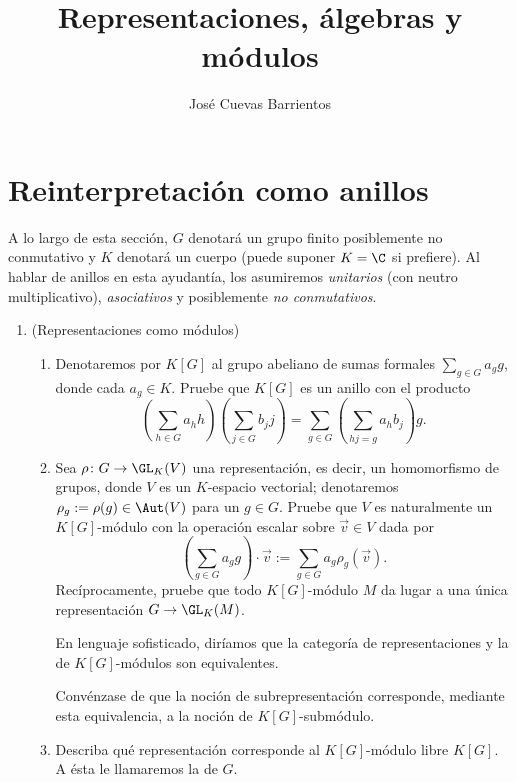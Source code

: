 \documentclass[11pt, reqno]{amsart}
\title{Representaciones, álgebras y módulos}
\date{\DTMdate{2025-06-19}}
\author{José Cuevas Barrientos}
\begin{document}
\maketitle

\nocite{jacobson:basic}

\section{Reinterpretación como anillos}
A lo largo de esta sección, $G$ denotará un grupo finito posiblemente no conmutativo y $K$ denotará un cuerpo
(puede suponer $K = \C$ si prefiere).
Al hablar de anillos en esta ayudantía, los asumiremos \emph{unitarios} (con neutro multiplicativo), \emph{asociativos}
y posiblemente \emph{no conmutativos}.

\begin{enumerate}
	\item (Representaciones como módulos)
		\begin{enumerate}
			\item Denotaremos por $K[G]$ al grupo abeliano de sumas formales $\sum_{g\in G} a_g g$, donde cada $a_g \in K$.
				Pruebe que $K[G]$ es un anillo con el producto
				\[
					\left( \sum_{h\in G} a_h h \right)\left( \sum_{j\in G} b_j j \right)
					= \sum_{g\in G} \left( \sum_{hj=g} a_hb_j \right) g.
				\]

			\item Sea $\rho \colon G \to \GL_K(V)$ una representación, es decir, un homomorfismo de grupos, donde
				$V$ es un $K$-espacio vectorial; denotaremos $\rho_g := \rho(g) \in \Aut(V)$ para un $g \in G$.
				Pruebe que $V$ es naturalmente un $K[G]$-módulo con la operación escalar sobre $\vec v \in V$
				dada por
				\[
					\left( \sum_{g\in G} a_g g \right)\cdot\vec v := \sum_{g\in G} a_g \rho_g(\vec v).
				\]
				Recíprocamente, pruebe que todo $K[G]$-módulo $M$ da lugar a una única representación $G \to
				\GL_K(M)$.

				\lookup
				En lenguaje sofisticado, diríamos que la categoría de representaciones y la de $K[G]$-módulos son
				equivalentes.

				\begin{prob}
					Convénzase de que la noción de subrepresentación corresponde, mediante esta
					equivalencia, a la noción de $K[G]$-submódulo.
				\end{prob}
			\item Describa qué representación corresponde al $K[G]$-módulo libre $K[G]$.
				A ésta le llamaremos la  de $G$.
		\end{enumerate}


\end{enumerate}
\end{document}
